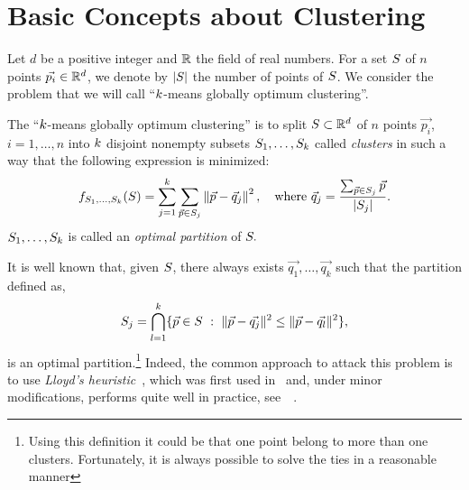 \documentclass{article}
\begin{document}
\section{Basic Concepts about Clustering}
\label{sec:BasicConceptsClustering}
Let $d$ be a positive integer and $\mathbb{R}$ the field of real numbers.
For a set $S$ of $n$ points $\vec{p_i}\in \mathbb{R}^d$, we denote by
$|S|$ the number of points of $S$. We consider the problem that
we will call  ``$k$-means globally optimum clustering''.
\begin{definition}
  The ``$k$-means globally optimum clustering'' is to split  
  $S\subset\mathbb{R}^{d}$ of $n$ points $\vec{p_i}$, $i=1,\ldots, n$ into
  $k$ disjoint 
  nonempty subsets $S_1,\ldots, S_{k}$ called \textit{clusters}
  in such a way that the following expression is minimized:
  \begin{equation*}
    f_{S_1,\ldots,S_{k}}(S)=\sum_{j=1}^k \sum_{\vec{p} \in S_j}
    \left\|\vec{p}-\vec{q}_j\right\|^2,\quad\text{where }
    \vec{q}_j = \frac{\sum_{\vec{p} \in S_j} \vec{p}}{|S_j|}.
  \end{equation*}
  $S_1,\ldots, S_{k}$ is called an \textit{optimal partition}
  of $S.$
\end{definition}
It is well known that, given $S$, there always exists
$\vec{q_1},\ldots, \vec{q_k}$ such that the partition defined as,
\begin{equation*}
  \Set_j=\bigcap_{l=1}^{k}\{\vec{p}\in\Set\ :\ 
  \|\vec{p}-\vec{q_j}\|^2\le \|\vec{p}-\vec{q_l}\|^2\},
\end{equation*}
is an optimal partition.\footnote{Using this definition it could be
  that one point belong to more than one clusters. Fortunately, it is
  always possible to solve the ties in a reasonable manner}
Indeed, the common approach to attack this problem is to use 
\textit{Lloyd's heuristic}~\cite{Lloy82}, which was first used
in~\cite{MacQ67} and, under minor modifications, performs quite well
in practice, see~~\cite{arthurVas07,ZhangXia09}.
\end{document}
